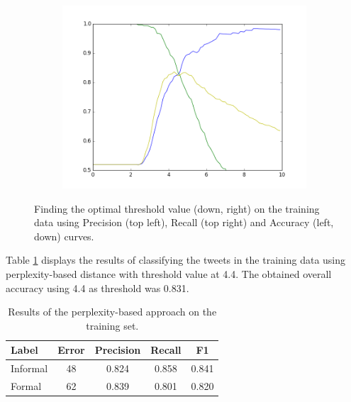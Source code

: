 \documentclass[information,article,submit,moreauthors,pdftex,10pt,a4paper]{Definitions/mdpi}
\begin{document}
\begin{figure}[H]
\begin{subfigure}[b]{0.49\linewidth}
 \end{subfigure}
 \begin{subfigure}[b]{0.49\linewidth}
   \includegraphics[width=\linewidth]{denaperp}
 \end{subfigure}
   \caption{Finding the optimal threshold value (down, right) on the training data using Precision (top left), Recall (top right) and Accuracy (left, down) curves.}\label{fig:threshold}
\end{figure}


Table \ref{tab:perplexitytrain} displays the results of classifying the tweets in the training data using perplexity-based distance with threshold value at 4.4. The obtained overall accuracy using 4.4 as threshold was 0.831.

\begin{table}[H]
  \centering
  \begin{tabular}{lcccc} \hline
    Label & Error & Precision & Recall & F1 \\ \hline \hline
    Informal & 48 & 0.824  & 0.858  & 0.841 \\
    Formal & 62 & 0.839 & 0.801 & 0.820 \\ \hline
  \end{tabular}
  \caption{Results of the perplexity-based approach on the training set.}
  \label{tab:perplexitytrain}
\end{table}
\end{document}

